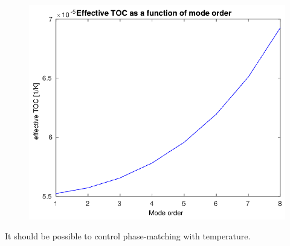 \documentclass[11pt, leqno]{beamer}
\begin{document}
\begin{frame}
	\begin{figure}
		\centering
		\vspace{-10pt}
		\includegraphics[width=.8\textwidth]{effectiveTOC.pdf}
		\label{fig_TOC_effective}
		\vspace{-10pt}
	\end{figure}
	It should be possible to control phase-matching with temperature.
\end{frame}
\end{document}
